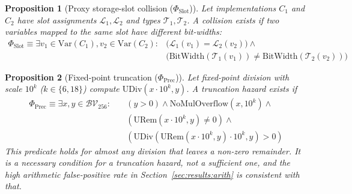 \documentclass[pdflatex,sn-mathphys]{sn-jnl}
\theoremstyle{thmstyleone}
\newtheorem{proposition}{Proposition}
\theoremstyle{thmstyletwo}
\begin{document}
\begin{proposition}[Proxy storage-slot collision ($\Phi_{\mathrm{Slot}}$)]\label{prop:proxy}
Let implementations $C_1$ and $C_2$ have slot assignments $\mathcal{L}_1, \mathcal{L}_2$ and types $\mathcal{T}_1, \mathcal{T}_2$. A collision exists if two variables mapped to the same slot have different bit-widths:
\begin{equation}
\begin{aligned}
    \Phi_{\mathrm{Slot}} \equiv \exists v_1 \in \mathrm{Var}(C_1), v_2 \in \mathrm{Var}(C_2) : {} & \big( \mathcal{L}_1(v_1) = \mathcal{L}_2(v_2) \big) \land {} \\
    & \big( \mathrm{BitWidth}(\mathcal{T}_1(v_1)) \neq \mathrm{BitWidth}(\mathcal{T}_2(v_2)) \big)
\end{aligned}
\end{equation}
\end{proposition}

\begin{proposition}[Fixed-point truncation ($\Phi_{\mathrm{Prec}}$)]\label{prop:prec}
Let fixed-point division with scale $10^k$ ($k \in \{6, 18\}$) compute $\mathrm{UDiv}(x \cdot 10^k, y)$. A truncation hazard exists if
\begin{equation}
\begin{aligned}
    \Phi_{\mathrm{Prec}} \equiv \exists x, y \in \mathcal{BV}_{256} : \quad & (y > 0) \land \mathrm{NoMulOverflow}(x, 10^k) \land {} \\
    & (\mathrm{URem}(x \cdot 10^k, y) \neq 0) \land {} \\
    & \left( \mathrm{UDiv}(\mathrm{URem}(x \cdot 10^k, y)\cdot 10^k, y) > 0 \right)
\end{aligned}
\end{equation}
This predicate holds for almost any division that leaves a non-zero remainder. It is a necessary condition for a truncation hazard, not a sufficient one, and the high arithmetic false-positive rate in Section~\ref{sec:results:arith} is consistent with that.
\end{proposition}
\end{document}
